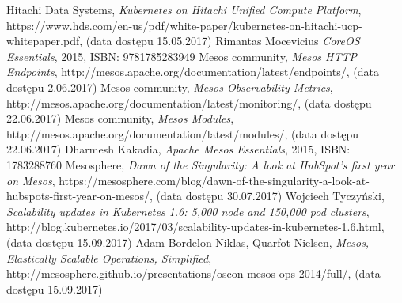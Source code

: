 \documentclass[10pt,a4paper,titlepage,twoside]{report}
\begin{document}
\begin{thebibliography}{99}
Hitachi Data Systems, \textit{Kubernetes on Hitachi Unified Compute Platform}, https://www.hds.com/en-us/pdf/white-paper/kubernetes-on-hitachi-ucp-whitepaper.pdf, (data dostępu 15.05.2017)
Rimantas Mocevicius \textit{CoreOS Essentials}, 2015, ISBN: 9781785283949
Mesos community, \textit{Mesos HTTP Endpoints}, http://mesos.apache.org/documentation/latest/endpoints/, (data dostępu 2.06.2017)
Mesos community, \textit{Mesos Observability Metrics}, http://mesos.apache.org/documentation/latest/monitoring/, (data dostępu 22.06.2017)
Mesos community, \textit{Mesos Modules}, http://mesos.apache.org/documentation/latest/modules/, (data dostępu 22.06.2017)
Dharmesh Kakadia, \textit{Apache Mesos Essentials}, 2015, ISBN: 1783288760
Mesosphere, \textit{Dawn of the Singularity: A look at HubSpot’s first year on Mesos}, https://mesosphere.com/blog/dawn-of-the-singularity-a-look-at-hubspots-first-year-on-mesos/, (data dostępu 30.07.2017)
Wojciech Tyczyński, \textit{Scalability updates in Kubernetes 1.6: 5,000 node and 150,000 pod clusters}, http://blog.kubernetes.io/2017/03/scalability-updates-in-kubernetes-1.6.html, (data dostępu 15.09.2017)
Adam Bordelon Niklas, Quarfot Nielsen, \textit{Mesos, Elastically Scalable Operations, Simplified}, http://mesosphere.github.io/presentations/oscon-mesos-ops-2014/full/, (data dostępu 15.09.2017)
\end{thebibliography}

\end{document}
